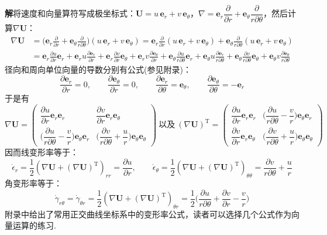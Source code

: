 \noindent\textbf{解}\quad 将速度和向量算符写成极坐标式：$\boldsymbol{U}=u\,\boldsymbol{e}_r+v\,\boldsymbol{e}_\theta$，$\nabla=\boldsymbol{e}_r\dfrac{\partial}{\partial r}+\boldsymbol{e}_\theta\dfrac{\partial}{r\partial\theta}$，然后计算$\nabla\boldsymbol{U}$：
\begin{align*}
\nabla\boldsymbol{U}&=\Big(\boldsymbol{e}_r\frac{\partial}{\partial r}+\boldsymbol{e}_\theta\frac{\partial}{r\partial\theta}\Big)(u\,\boldsymbol{e}_r+v\,\boldsymbol{e}_\theta)
=\boldsymbol{e}_r\frac{\partial}{\partial r}(u\,\boldsymbol{e}_r+v\,\boldsymbol{e}_\theta)+\boldsymbol{e}_\theta\frac{\partial}{r\partial\theta}(u\,\boldsymbol{e}_r+v\,\boldsymbol{e}_\theta)\\
&=\boldsymbol{e}_r\frac{\partial u}{\partial r}\boldsymbol{e}_r+\boldsymbol{e}_r u\frac{\partial\boldsymbol{e}_r}{\partial r}+\boldsymbol{e}_r\frac{\partial v}{\partial r}\boldsymbol{e}_\theta+\boldsymbol{e}_r v\frac{\partial\boldsymbol{e}_\theta}{\partial r}
+\boldsymbol{e}_\theta\frac{\partial u}{r\partial\theta}\boldsymbol{e}_r+\boldsymbol{e}_\theta u\frac{\partial\boldsymbol{e}_r}{r\partial\theta}
+\boldsymbol{e}_\theta\frac{\partial v}{r\partial\theta}\boldsymbol{e}_\theta+\boldsymbol{e}_\theta v\frac{\partial\boldsymbol{e}_\theta}{r\partial\theta}
\end{align*}
径向和周向单位向量的导数分别有公式(参见附录)：
\[
\frac{\partial\boldsymbol{e}_r}{\partial r}=0,\qquad \frac{\partial\boldsymbol{e}_\theta}{\partial r}=0,\qquad \frac{\partial\boldsymbol{e}_r}{\partial\theta}=\boldsymbol{e}_\theta,\qquad \frac{\partial\boldsymbol{e}_\theta}{\partial\theta}=-\boldsymbol{e}_r
\]
于是有
\[
\nabla\boldsymbol{U}=\begin{pmatrix}
\dfrac{\partial u}{\partial r}\boldsymbol{e}_r\boldsymbol{e}_r & \dfrac{\partial v}{\partial r}\boldsymbol{e}_r\boldsymbol{e}_\theta\\[10pt]
\Big(\dfrac{\partial u}{r\partial\theta}-\dfrac{v}{r}\Big)\boldsymbol{e}_\theta\boldsymbol{e}_r & \Big(\dfrac{\partial v}{r\partial\theta}+\dfrac{u}{r}\Big)\boldsymbol{e}_\theta\boldsymbol{e}_\theta
\end{pmatrix}
\ \text{以及}\
(\nabla\boldsymbol{U})^{\mathrm{T}}=\begin{pmatrix}
\dfrac{\partial u}{\partial r}\boldsymbol{e}_r\boldsymbol{e}_r & \Big(\dfrac{\partial u}{r\partial\theta}-\dfrac{v}{r}\Big)\boldsymbol{e}_\theta\boldsymbol{e}_r\\[10pt]
\dfrac{\partial v}{\partial r}\boldsymbol{e}_r\boldsymbol{e}_\theta & \Big(\dfrac{\partial v}{r\partial\theta}+\dfrac{u}{r}\Big)\boldsymbol{e}_\theta\boldsymbol{e}_\theta
\end{pmatrix}
\]
因而线变形率等于：
\[
\dot{\epsilon}_r=\frac{1}{2}(\nabla\boldsymbol{U}+(\nabla\boldsymbol{U})^{\mathrm{T}})_{rr}=\frac{\partial u}{\partial r},\qquad
\dot{\epsilon}_\theta=\frac{1}{2}(\nabla\boldsymbol{U}+(\nabla\boldsymbol{U})^{\mathrm{T}})_{\theta\theta}=\frac{\partial v}{r\partial\theta}+\frac{u}{r}
\]
角变形率等于：
\[
\dot{\gamma}_{r\theta}=\dot{\gamma}_{\theta r}=\frac{1}{2}(\nabla\boldsymbol{U}+(\nabla\boldsymbol{U})^{\mathrm{T}})_{\theta r}=\frac{1}{2}\Big(\frac{\partial u}{r\partial\theta}+\frac{\partial v}{\partial r}-\frac{v}{r}\Big)
\]
附录中给出了常用正交曲线坐标系中的变形率公式，读者可以选择几个公式作为向量运算的练习.

